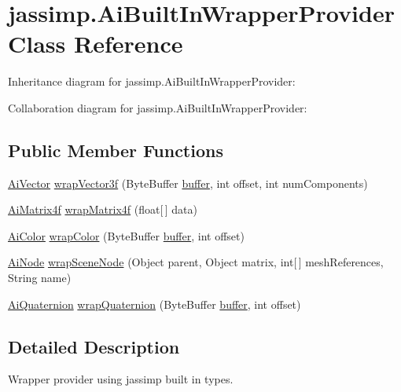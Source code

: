 \hypertarget{classjassimp_1_1_ai_built_in_wrapper_provider}{\section{jassimp.\+Ai\+Built\+In\+Wrapper\+Provider Class Reference}
\label{classjassimp_1_1_ai_built_in_wrapper_provider}
}


Inheritance diagram for jassimp.\+Ai\+Built\+In\+Wrapper\+Provider\+:


Collaboration diagram for jassimp.\+Ai\+Built\+In\+Wrapper\+Provider\+:
\subsection*{Public Member Functions}
\begin{DoxyCompactItemize}
\item 
\hyperlink{classjassimp_1_1_ai_vector}{Ai\+Vector} \hyperlink{classjassimp_1_1_ai_built_in_wrapper_provider_a9b1431d6caec7f20a21b42d7f9136a64}{wrap\+Vector3f} (Byte\+Buffer \hyperlink{structbuffer}{buffer}, int offset, int num\+Components)
\item 
\hyperlink{classjassimp_1_1_ai_matrix4f}{Ai\+Matrix4f} \hyperlink{classjassimp_1_1_ai_built_in_wrapper_provider_a41d8c81c95f316ae540ea709d0f84809}{wrap\+Matrix4f} (float\mbox{[}$\,$\mbox{]} data)
\item 
\hyperlink{classjassimp_1_1_ai_color}{Ai\+Color} \hyperlink{classjassimp_1_1_ai_built_in_wrapper_provider_a069b712bf1cbb700756319659125a490}{wrap\+Color} (Byte\+Buffer \hyperlink{structbuffer}{buffer}, int offset)
\item 
\hyperlink{classjassimp_1_1_ai_node}{Ai\+Node} \hyperlink{classjassimp_1_1_ai_built_in_wrapper_provider_a4547edb169d62bf8ae898b4898bdb304}{wrap\+Scene\+Node} (Object parent, Object matrix, int\mbox{[}$\,$\mbox{]} mesh\+References, String name)
\item 
\hyperlink{classjassimp_1_1_ai_quaternion}{Ai\+Quaternion} \hyperlink{classjassimp_1_1_ai_built_in_wrapper_provider_ae9fd66fc16ee669b765ca5775f019ef6}{wrap\+Quaternion} (Byte\+Buffer \hyperlink{structbuffer}{buffer}, int offset)
\end{DoxyCompactItemize}


\subsection{Detailed Description}
Wrapper provider using jassimp built in types. 

